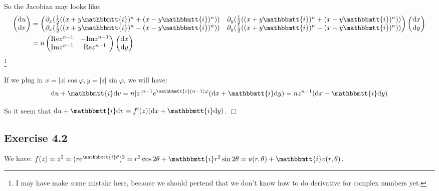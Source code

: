 \documentclass[]{ctexart}
\newcommand{\mi}{\mathbbmtt{i}}
\newcommand{\di}{\mathrm{d}}
\newcommand{\pa}{\partial}
\newcommand{\me}{\mathrm{e}}
\begin{document}
		So the Jacobian may looks like:
			\begin{equation*}
			\begin{aligned}
				\begin{pmatrix}
				\di u\\
				\di v
				\end{pmatrix}
				&=
				\begin{pmatrix}
				\pa_x(\frac{1}{2}((x+y\mi)^n+(x-y\mi)^n)) & \pa_y(\frac{1}{2}((x+y\mi)^n+(x-y\mi)^n))\\
				\pa_x(\frac{1}{2}((x+y\mi)^n-(x-y\mi)^n)) & \pa_y(\frac{1}{2}((x+y\mi)^n-(x-y\mi)^n))
				\end{pmatrix}
				\begin{pmatrix}
				\di x\\
				\di y
				\end{pmatrix}\\
				&=n
				\begin{pmatrix}
				\text{Re}z^{n-1} & -\text{Im}z^{n-1}\\
				\text{Im}z^{n-1} & \text{Re}z^{n-1}
				\end{pmatrix}
				\begin{pmatrix}
				\di x\\
				\di y
				\end{pmatrix}\\
			\end{aligned}
			\end{equation*}
		\footnote{I may have make some mistake here, because we should pertend that we don't know how to do derivative for complex numbers yet. }
		
		If we plug in $x=|z|\cos \varphi, y=|z|\sin \varphi$, we will have:
			\begin{equation*}
			\begin{aligned}
				\di u+\mi \di v=n|z|^{n-1}e^{\mi (n-1)\varphi}(\di x+\mi \di y)=nz^{n-1}(\di x+\mi \di y)
			\end{aligned}
			\end{equation*}
		
		So it seem that $\di u+\mi \di v=f'(z)(\di x+\mi \di y)$. \qquad $\Box$
		
	\subsection{Exercise 4.2}
		We have: $f(z)=z^2=(r\me^{\mi \theta})^2=r^2\cos 2\theta +\mi r^2\sin2\theta=u(r,\theta)+\mi v(r,\theta)$. 
		
\end{document}
